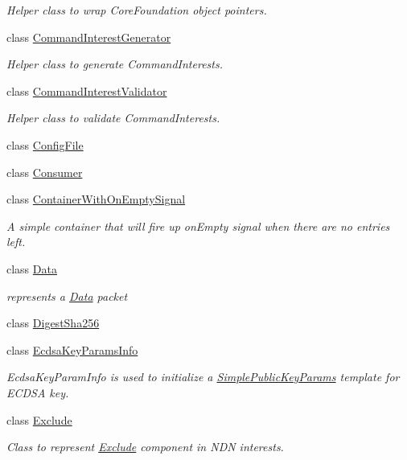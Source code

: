 \begin{DoxyCompactItemize}
\begin{DoxyCompactList}\small\item\em Helper class to wrap Core\+Foundation object pointers. \end{DoxyCompactList}\item 
class \hyperlink{classndn_1_1CommandInterestGenerator}{Command\+Interest\+Generator}
\begin{DoxyCompactList}\small\item\em Helper class to generate Command\+Interests. \end{DoxyCompactList}\item 
class \hyperlink{classndn_1_1CommandInterestValidator}{Command\+Interest\+Validator}
\begin{DoxyCompactList}\small\item\em Helper class to validate Command\+Interests. \end{DoxyCompactList}\item 
class \hyperlink{classndn_1_1ConfigFile}{Config\+File}
\item 
class \hyperlink{classndn_1_1Consumer}{Consumer}
\item 
class \hyperlink{classndn_1_1ContainerWithOnEmptySignal}{Container\+With\+On\+Empty\+Signal}
\begin{DoxyCompactList}\small\item\em A simple container that will fire up on\+Empty signal when there are no entries left. \end{DoxyCompactList}\item 
class \hyperlink{classndn_1_1Data}{Data}
\begin{DoxyCompactList}\small\item\em represents a \hyperlink{classndn_1_1Data}{Data} packet \end{DoxyCompactList}\item 
class \hyperlink{classndn_1_1DigestSha256}{Digest\+Sha256}
\item 
class \hyperlink{classndn_1_1EcdsaKeyParamsInfo}{Ecdsa\+Key\+Params\+Info}
\begin{DoxyCompactList}\small\item\em Ecdsa\+Key\+Param\+Info is used to initialize a \hyperlink{classndn_1_1SimplePublicKeyParams}{Simple\+Public\+Key\+Params} template for E\+C\+D\+SA key. \end{DoxyCompactList}\item 
class \hyperlink{classndn_1_1Exclude}{Exclude}
\begin{DoxyCompactList}\small\item\em Class to represent \hyperlink{classndn_1_1Exclude}{Exclude} component in N\+DN interests. \end{DoxyCompactList}\item 

\end{DoxyCompactItemize}
